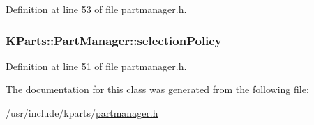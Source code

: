 \-Definition at line 53 of file partmanager.\-h.

\hypertarget{classKParts_1_1PartManager_a277840d67f7fbbacf3e11a272d649ac1}{
\subsubsection[{selection\-Policy}]{ {\bf \-K\-Parts\-::\-Part\-Manager\-::selection\-Policy}}}\label{classKParts_1_1PartManager_a277840d67f7fbbacf3e11a272d649ac1}


\-Definition at line 51 of file partmanager.\-h.



\-The documentation for this class was generated from the following file\-:\begin{DoxyCompactItemize}
\item 
/usr/include/kparts/\hyperlink{partmanager_8h}{partmanager.\-h}\end{DoxyCompactItemize}
